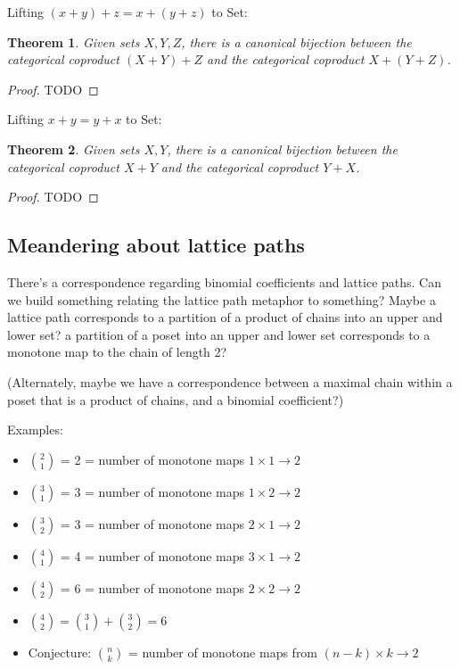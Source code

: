 \documentclass{proc-l}
\newtheorem{theorem}{Theorem}[section]
\theoremstyle{definition}
\theoremstyle{remark}
\numberwithin{equation}{section}
\begin{document}

Lifting \((x + y) + z = x + (y + z)\) to Set:

\begin{theorem}
Given sets \(X, Y, Z\), there is a canonical bijection between the categorical coproduct \((X + Y) + Z\) and the categorical coproduct \(X + (Y + Z)\).
\end{theorem}

\begin{proof}
TODO
\end{proof} 


Lifting \(x + y = y + x\) to Set:

\begin{theorem}
Given sets \(X, Y\), there is a canonical bijection between the categorical coproduct \(X + Y\) and the categorical coproduct \(Y + X\).
\end{theorem}

\begin{proof}
TODO
\end{proof}

\subsection{Meandering about lattice paths}

There's a correspondence regarding binomial coefficients and lattice paths. Can we build something relating the lattice path metaphor to something? Maybe a lattice path corresponds to a partition of a product of chains into an upper and lower set? a partition of a poset into an upper and lower set corresponds to a monotone map to the chain of length 2? 

(Alternately, maybe we have a correspondence between a maximal chain within a poset that is a product of chains, and a binomial coefficient?)

Examples:
\begin{itemize}
    \item \({2 \choose 1}\) = 2 = number of monotone maps \(1 \times 1 \to 2\)
    \item \({3 \choose 1}\) = 3 = number of monotone maps \(1 \times 2 \to 2\)
    \item \({3 \choose 2}\) = 3 = number of monotone maps \(2 \times 1 \to 2\)
    \item \({4 \choose 1}\) = 4 = number of monotone maps \(3 \times 1 \to 2\)
    \item \({4 \choose 2}\) = 6 = number of monotone maps \(2 \times 2 \to 2\)
    \item \({4 \choose 2} = {3 \choose 1} + {3 \choose 2} = 6\)

    \item Conjecture: \({n \choose k}\) = number of monotone maps from \((n - k) \times k \to 2\)
\end{itemize}
\end{document}
